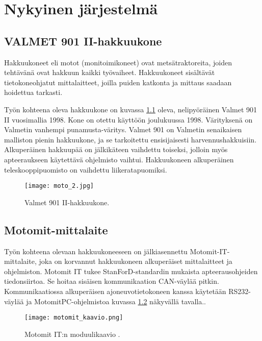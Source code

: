\newpage

\chapter{Nykyinen järjestelmä}

\section{VALMET 901 II-hakkuukone}

Hakkuukoneet eli motot (monitoimikoneet) ovat metsätraktoreita, joiden tehtävänä ovat hakkuun kaikki työvaiheet. Hakkuukoneet sisältävät tietokoneohjatut mittalaitteet, joilla puiden katkonta ja mittaus saadaan hoidettua tarkasti.

Työn kohteena oleva hakkuukone on kuvassa \ref{hakkuukone} oleva, nelipyöräinen Valmet 901 II vuosimallia 1998. Kone on otettu käyttöön joulukuussa 1998. Värityksenä on Valmetin vanhempi punamusta-väritys. Valmet 901 on Valmetin senaikaisen malliston pienin hakkuukone, ja se tarkoitettu ensisijaisesti harvennushakkuisiin. Alkuperäinen hakkuupää on jälkikäteen vaihdettu toiseksi, jolloin myös apteeraukseen käytettävä ohjelmisto vaihtui. Hakkuukoneen alkuperäinen teleskooppipuomisto on vaihdettu liikeratapuomiksi.
\newline

\begin{figure}[H]
\centering
\texttt{[image: moto\_2.jpg]}
\caption{Valmet 901 II-hakkuukone.}
\label{hakkuukone}
\end{figure}

\section{Motomit-mittalaite}

Työn kohteena olevaan hakkuukoneeseen on jälkiasennettu Motomit-IT-mittalaite, joka on korvannut hakkuukoneen alkuperäiset mittalaitteet ja ohjelmiston. Motomit IT tukee StanForD-standardin mukaista apteerausohjeiden tiedonsiirtoa. Se hoitaa sisäisen kommunikaation CAN-väylää pitkin. Kommunikaatiossa alkuperäisen ajoneuvotietokoneen kanssa käytetään RS232-väylää ja MotomitPC-ohjelmistoa kuvassa \ref{motomit:modulikaavio} näkyvällä tavalla.\cite{motomit:esite}.
\newline

\begin{figure}[H]
\centering
\texttt{[image: motomit\_kaavio.png]}
\caption{Motomit IT:n moduulikaavio \cite{motomit:manual}.}
\label{motomit:modulikaavio}
\end{figure}
\newpage

